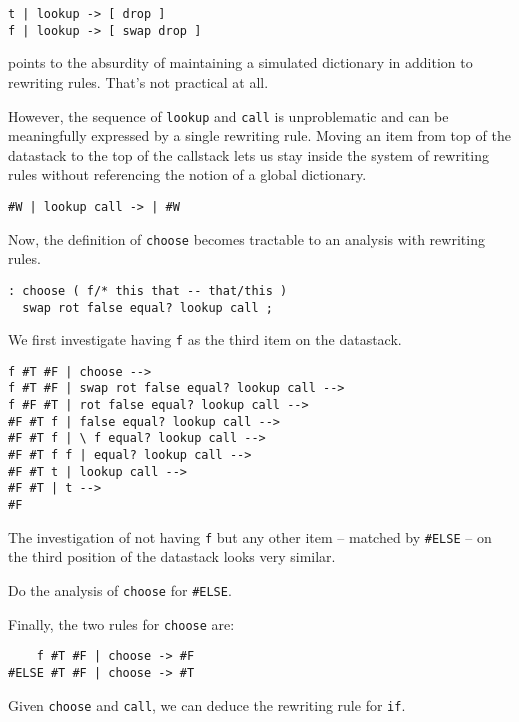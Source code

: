 \begin{verbatim}
t | lookup -> [ drop ]
f | lookup -> [ swap drop ]
\end{verbatim}

points to the absurdity of maintaining a simulated dictionary in addition to rewriting rules. That's not practical at all.

However, the sequence of \verb|lookup| and \verb|call| is unproblematic and can be meaningfully expressed by a single rewriting rule. Moving an item from top of the datastack to the top of the callstack lets us stay inside the system of rewriting rules without referencing the notion of a global dictionary.

\begin{verbatim}
#W | lookup call -> | #W
\end{verbatim}

Now, the definition of \verb|choose| becomes tractable to an analysis with rewriting rules.

\begin{verbatim}
: choose ( f/* this that -- that/this )
  swap rot false equal? lookup call ;
\end{verbatim}

We first investigate having \verb|f| as the third item on the datastack.

\begin{verbatim}
f #T #F | choose -->
f #T #F | swap rot false equal? lookup call -->
f #F #T | rot false equal? lookup call -->
#F #T f | false equal? lookup call -->
#F #T f | \ f equal? lookup call -->
#F #T f f | equal? lookup call -->
#F #T t | lookup call -->
#F #T | t -->
#F
\end{verbatim}

The investigation of not having \verb|f| but any other item -- matched by \verb|#ELSE| -- on the third position of the datastack looks very similar.

\begin{exercise}\label{ex:choose.ELSE}
Do the analysis of \verb|choose| for \verb|#ELSE|.
\end{exercise}

Finally, the two rules for \verb|choose| are:

\begin{verbatim}
    f #T #F | choose -> #F
#ELSE #T #F | choose -> #T
\end{verbatim}

Given \verb|choose| and \verb|call|, we can deduce the rewriting rule for \verb|if|.

